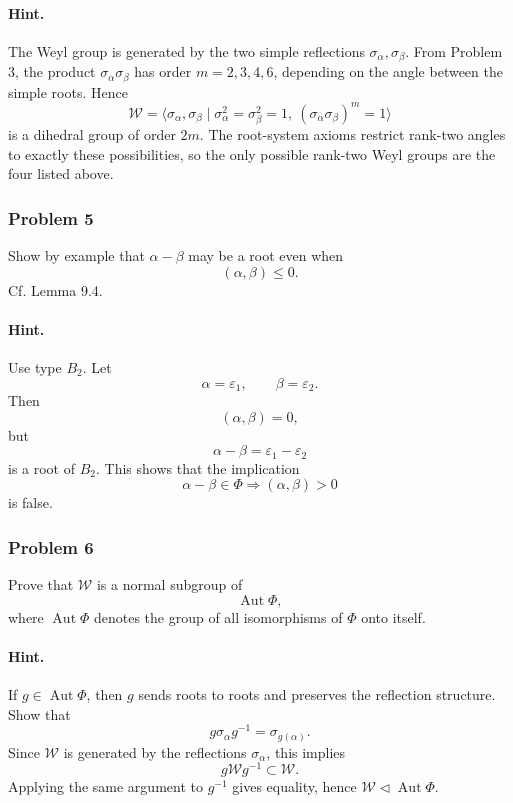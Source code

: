 \documentclass[12pt, a4paper]{article}
\begin{document}
\paragraph{Hint.}
The Weyl group is generated by the two simple reflections
\(\sigma_\alpha,\sigma_\beta\). From Problem 3, the product
\(\sigma_\alpha\sigma_\beta\) has order \(m=2,3,4,6\), depending on the angle
between the simple roots. Hence
\[
\mathcal W=\langle \sigma_\alpha,\sigma_\beta
\mid \sigma_\alpha^2=\sigma_\beta^2=1,\ 
(\sigma_\alpha\sigma_\beta)^m=1\rangle
\]
is a dihedral group of order \(2m\). The root-system axioms restrict rank-two
angles to exactly these possibilities, so the only possible rank-two Weyl
groups are the four listed above.

\subsubsection{Problem 5}

Show by example that \(\alpha-\beta\) may be a root even when
\[
(\alpha,\beta)\leq 0.
\]
Cf. Lemma 9.4.

\paragraph{Hint.}
Use type \(B_2\). Let
\[
\alpha=\varepsilon_1,\qquad \beta=\varepsilon_2.
\]
Then
\[
(\alpha,\beta)=0,
\]
but
\[
\alpha-\beta=\varepsilon_1-\varepsilon_2
\]
is a root of \(B_2\). This shows that the implication
\[
\alpha-\beta\in\Phi \Longrightarrow (\alpha,\beta)>0
\]
is false.

\subsubsection{Problem 6}

Prove that \(\mathcal W\) is a normal subgroup of
\[
\operatorname{Aut}\Phi,
\]
where \(\operatorname{Aut}\Phi\) denotes the group of all isomorphisms of
\(\Phi\) onto itself.

\paragraph{Hint.}
If \(g\in \operatorname{Aut}\Phi\), then \(g\) sends roots to roots and
preserves the reflection structure. Show that
\[
g\sigma_\alpha g^{-1}=\sigma_{g(\alpha)}.
\]
Since \(\mathcal W\) is generated by the reflections \(\sigma_\alpha\), this
implies
\[
g\mathcal W g^{-1}\subset \mathcal W.
\]
Applying the same argument to \(g^{-1}\) gives equality, hence
\(\mathcal W\triangleleft \operatorname{Aut}\Phi\).
\end{document}
